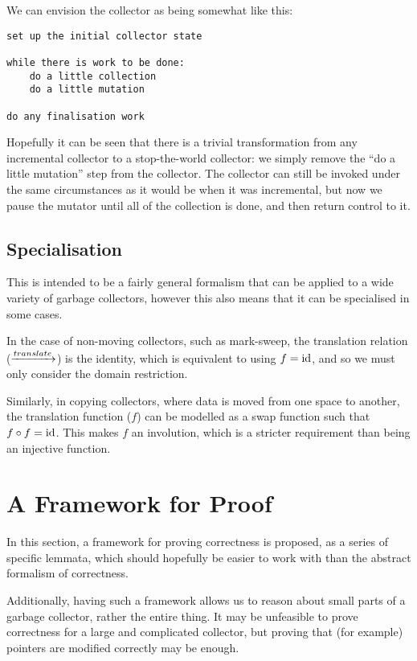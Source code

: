 We can envision the collector as being somewhat like this:

\begin{verbatim}
set up the initial collector state

while there is work to be done:
    do a little collection
    do a little mutation

do any finalisation work
\end{verbatim}

Hopefully it can be seen that there is a trivial transformation from
any \gls{incremental collector} to a stop-the-world \gls{collector}:
we simply remove the ``do a little mutation'' step from the
collector. The collector can still be invoked under the same
circumstances as it would be when it was incremental, but now we pause
the \gls{mutator} until all of the collection is done, and then return
control to it.

\subsection{Specialisation}

This is intended to be a fairly general formalism that can be applied
to a wide variety of garbage collectors, however this also means that
it can be specialised in some cases.

In the case of non-moving collectors, such as mark-sweep, the
translation relation ($\xrightarrow{translate}$) is the identity, which is
equivalent to using $f = \mathrm{id}$, and so we must only consider the domain
restriction.

Similarly, in copying collectors, where data is moved from one space
to another, the translation function ($f$) can be modelled as a swap
function such that $f \circ f = \mathrm{id}$. This makes $f$ an involution,
which is a stricter requirement than being an injective function.

\section{A Framework for Proof}

In this section, a framework for proving correctness is proposed, as a
series of specific lemmata, which should hopefully be easier to work
with than the abstract formalism of correctness.

Additionally, having such a framework allows us to reason about small
parts of a \gls{garbage collector}, rather the entire thing. It may be
unfeasible to prove correctness for a large and complicated
\gls{collector}, but proving that (for example) \glspl{pointer} are
modified correctly may be enough.

